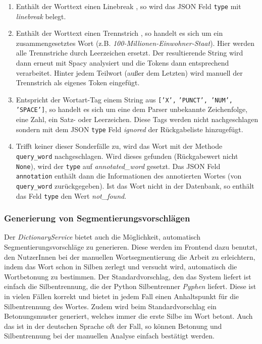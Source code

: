 \begin{itemize}
\begin{enumerate}
	\item Enthält der Worttext einen Linebreak , so wird das JSON Feld \texttt{type} mit \textit{linebreak} belegt.
	
	\item Enthält der Worttext einen Trennstrich \qq{\texttt{-}}, so handelt es sich um ein zusammengesetztes Wort (z.B. \textit{100-Millionen-Einwohner-Staat}). Hier werden alle Trennstriche durch Leerzeichen ersetzt. Der resultierende String wird dann erneut mit Spacy analysiert und die Tokens dann entsprechend verarbeitet. Hinter jedem Teilwort (außer dem Letzten) wird manuell der Trennstrich als eigenes Token eingefügt.
	
	\item Entspricht der Wortart-Tag einem String aus \texttt{['X',} \texttt{'PUNCT', }\texttt{'NUM', }\\
	\texttt{'SPACE']}, so handelt es sich um eine dem Parser unbekannte Zeichenfolge, eine Zahl, ein Satz- oder Leerzeichen. Diese Tags werden nicht nachgeschlagen sondern mit dem JSON \texttt{type} Feld \textit{ignored} der Rückgabeliste hinzugefügt.
	
	\item Trifft keiner dieser Sonderfälle zu, wird das Wort mit der Methode \texttt{query\_word} nachgeschlagen. Wird dieses gefunden (Rückgabewert nicht \texttt{None}), wird der \texttt{type} auf \textit{annotated\_word} gesetzt. Das JSON Feld \texttt{annotation} enthält dann die Informationen des annotierten Wortes (von \texttt{query\_word} zurückgegeben). Ist das Wort nicht in der Datenbank, so enthält das Feld \texttt{type} den Wert \textit{not\_found}.
\end{enumerate}

\end{itemize}

\subsubsection{Generierung von Segmentierungsvorschlägen}
\label{sec:segmentation-proposals}

Der \textit{DictionaryService} bietet auch die Möglichkeit, automatisch Segmentierungsvorschläge zu generieren. Diese werden im Frontend dazu benutzt, den NutzerInnen bei der manuellen Wortsegmentierung die Arbeit zu erleichtern, indem das Wort schon in Silben zerlegt und versucht wird, automatisch die Wortbetonung zu bestimmen. Der Standardvorschlag, den das System liefert ist einfach die Silbentrennung, die der Python Silbentrenner \textit{Pyphen} liefert. Diese ist in vielen Fällen korrekt und bietet in jedem Fall einen Anhaltspunkt für die Silbentrennung des Wortes. Zudem wird beim Standardvorschlag ein Betonungsmuster generiert, welches immer die erste Silbe im Wort betont. Auch das ist in der deutschen Sprache oft der Fall, so können Betonung und Silbentrennung bei der manuellen Analyse einfach bestätigt werden.

